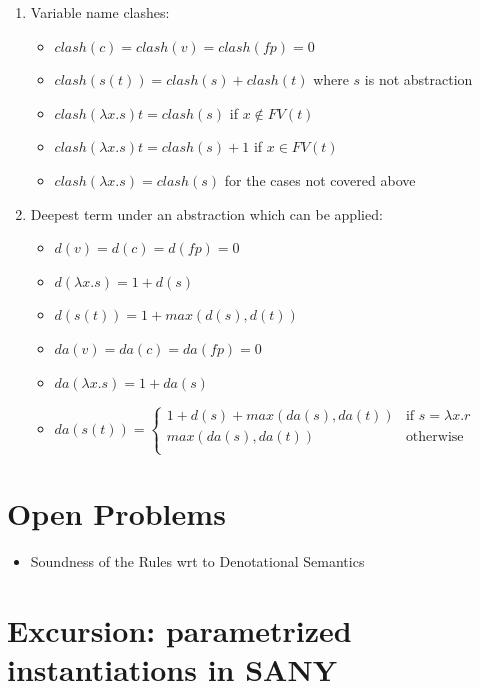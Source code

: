 \documentclass[a4paper]{article}
\theoremstyle{definition}
\begin{document}
\begin{enumerate}
\item Variable name clashes:
  \begin{itemize}
  \item $clash(c)=clash(v)=clash(fp)=0$
  \item $clash(s(t)) = clash(s) + clash(t)$ where $s$ is not abstraction
  \item $clash(\lambda x . s) t = clash(s)$ if $x \not \in FV(t)$
  \item $clash(\lambda x . s) t = clash(s) + 1$ if $x \in FV(t)$
  \item $clash(\lambda x . s) = clash(s)$ for the cases not covered above
  \end{itemize}

\item Deepest term under an abstraction which can be applied:
  \begin{itemize}
  \item $d(v)=d(c)=d(fp)=0$
  \item $d(\lambda x . s)=1 + d(s)$
  \item $d(s(t))= 1 + max(d(s), d(t))$
  \end{itemize}

  \begin{itemize}
  \item $da(v)=da(c)=da(fp)=0$
  \item $da(\lambda x . s)=1 + da(s)$
  \item $da(s(t))= \left\{
      \begin{array}{rl}
        1 + d(s) + max(da(s),da(t))&\mbox{if }s=\lambda x.r\\
        max(da(s),da(t))&\mbox{otherwise}\\
      \end{array}\right.$
  \end{itemize}

\end{enumerate}

\section{Open Problems}
\begin{itemize}
\item Soundness of the Rules wrt to Denotational Semantics
\end{itemize}

\section{Excursion: parametrized instantiations in SANY}
\label{sec:param-inst}
\end{document}
